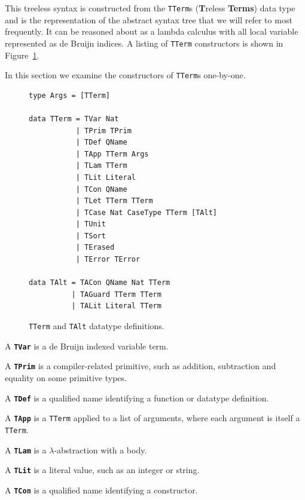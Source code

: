 This treeless syntax is constructed from the \lstinline{TTerm}s (\textbf{T}reless \textbf{Terms}) data type and is the representation of the abstract syntax tree that we will refer to most frequently. It can be reasoned about as a lambda calculus with all local variable represented as de Bruijn indices. A listing of \lstinline{TTerm} constructors is shown in Figure~\ref{code:TTerm}.

In this section we examine the constructors of \lstinline{TTerm}s one-by-one.\cite{agdahackage}


\begin{figure}[h]
\begin{lstlisting}[style=blockhaskell]
type Args = [TTerm]

data TTerm = TVar Nat
           | TPrim TPrim
           | TDef QName
           | TApp TTerm Args
           | TLam TTerm
           | TLit Literal
           | TCon QName
           | TLet TTerm TTerm
           | TCase Nat CaseType TTerm [TAlt]
           | TUnit
           | TSort
           | TErased
           | TError TError

data TAlt = TACon QName Nat TTerm
          | TAGuard TTerm TTerm
          | TALit Literal TTerm
\end{lstlisting}
\caption{\lstinline{TTerm} and \lstinline{TAlt} datatype definitions.}
\label{code:TTerm}
\end{figure}

A \textbf{\lstinline{TVar}} is a de Bruijn indexed variable term.

A \textbf{\lstinline{TPrim}} is a compiler-related primitive, such as addition, subtraction and equality on some primitive types.

A \textbf{\lstinline{TDef}} is a qualified name identifying a function or datatype definition.

A \textbf{\lstinline{TApp}} is a \lstinline{TTerm} applied to a list of arguments, where each argument is itself a \lstinline{TTerm}.

A \textbf{\lstinline{TLam}} is a $\lambda$-abstraction with a body.

A \textbf{\lstinline{TLit}} is a literal value, such as an integer or string.

A \textbf{\lstinline{TCon}} is a qualified name identifying a constructor.

